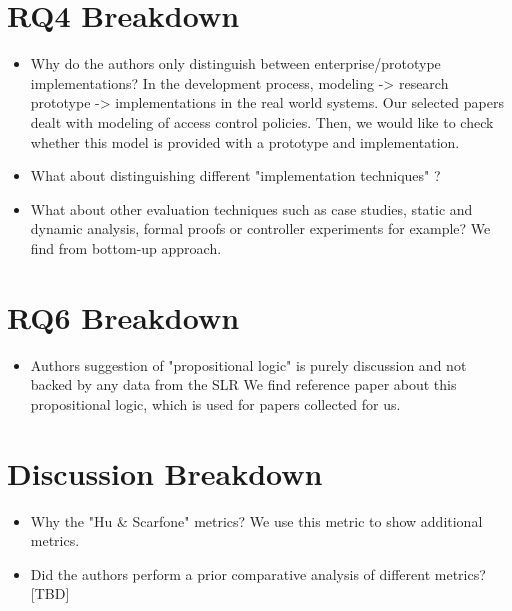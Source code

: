 \section{RQ4 Breakdown}

\begin{itemize}

\item Why do the authors only distinguish between enterprise/prototype implementations?
In the development process, modeling -> research prototype -> implementations in the real world systems.
Our selected papers dealt with modeling of access control policies. Then, we would like to check whether this model is provided with a prototype and implementation.

\item What about distinguishing different "implementation techniques" ?

\item What about other evaluation techniques such as case studies, static and dynamic analysis, formal proofs or controller experiments for example?
We find from bottom-up approach.

\end{itemize}


\section{RQ6 Breakdown}

\begin{itemize}

\item Authors suggestion of "propositional logic" is purely discussion and not backed by any data from the SLR
We find reference paper about this propositional logic, which is used for papers collected for us. 

\end{itemize}


\section{Discussion Breakdown}

\begin{itemize}

\item Why the "Hu \& Scarfone" metrics?
We use this metric to show additional metrics.

\item Did the authors perform a prior comparative analysis of different metrics?
[TBD] 

\end{itemize}
